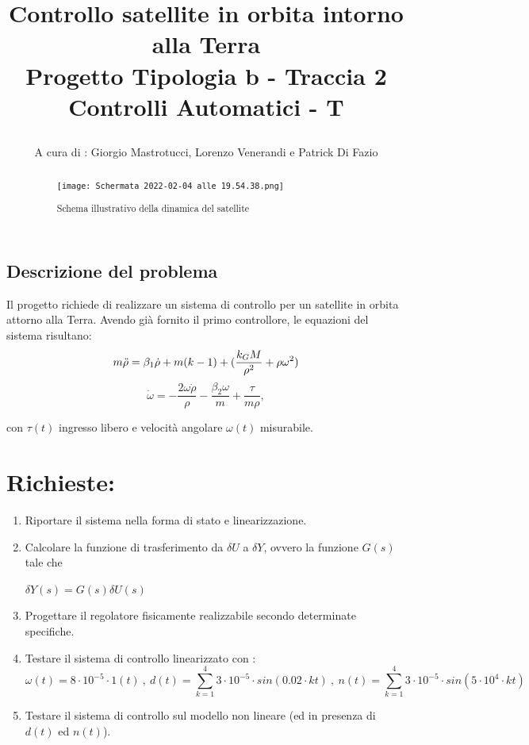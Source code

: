 \documentclass{article}
\title{
Controllo satellite in orbita intorno alla Terra\\
  \large Progetto Tipologia b - Traccia 2 \\
Controlli Automatici - T

}
\author{A cura di : Giorgio Mastrotucci, Lorenzo Venerandi e Patrick Di Fazio}
\date{}
\begin{document}
\maketitle
\begin{abstract}



\begin{figure}[h!]
\centering
\texttt{[image: Schermata 2022-02-04 alle 19.54.38.png]}
\caption{\label{fig:orbit}Schema illustrativo della dinamica del satellite}
\end{figure}
\end{abstract}

\begin{center}
\section*{Descrizione del problema}
\end{center}
Il progetto richiede di realizzare un sistema di controllo per un satellite in orbita attorno alla Terra.
Avendo già fornito il primo controllore, le equazioni del sistema risultano:
\[m \Ddot{\rho} = \beta_1\Dot{\rho} + m(k-1)+  (\frac{k_G M}{\rho^{2}} + \rho \omega^{2}) \]
\[\Dot{\omega} = -\frac{2\omega \Dot{\rho} }{\rho} -
\frac{\beta_2 \omega }{m}+ \frac{\tau}{m \rho} ,\]

\noindent
con $\tau(t)$ ingresso libero e velocità angolare $\omega(t)$ misurabile.

\section*{Richieste:}
\begin{enumerate}
\item Riportare il sistema nella forma di stato e linearizzazione.
\item Calcolare la funzione di trasferimento da $\delta U$  a  $\delta Y$,  ovvero la funzione $G(s)$ tale che  \begin{center} $\delta Y (s) = G(s) \delta U (s)$ \end{center}
\item Progettare il regolatore fisicamente realizzabile secondo determinate specifiche.
\item Testare il sistema di controllo linearizzato con :
\[	\omega(t)=8\cdot 10^{-5} \cdot 1(t) \ , \ d(t)= \sum_{k=1}^4 3 \cdot 10^{-5}\cdot sin(0.02 \cdot kt) \ , \  n(t)= \sum_{k=1}^4 3 \cdot 10^{-5}\cdot sin(5\cdot10^{4} \cdot kt)\]
\item Testare il sistema di controllo sul modello non lineare (ed in presenza di $d(t)$ ed $n(t)$).
\end{enumerate}
\end{document}
